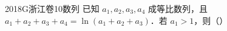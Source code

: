 
\begin{problem}{2018}{G}{浙江卷}{10}{数列}
已知 $ a_1,a_2,a_3,a_4 $ 成等比数列，且 $ a_1+a_2+a_3+a_4=\ln(a_1+a_2+a_3) $．若 $ a_1>1 $，则（\hspace{1cm}）
\begin{choices}
\end{choices}
\end{problem}

\begin{answer}

\end{answer}

\begin{solutions}

\end{solutions}